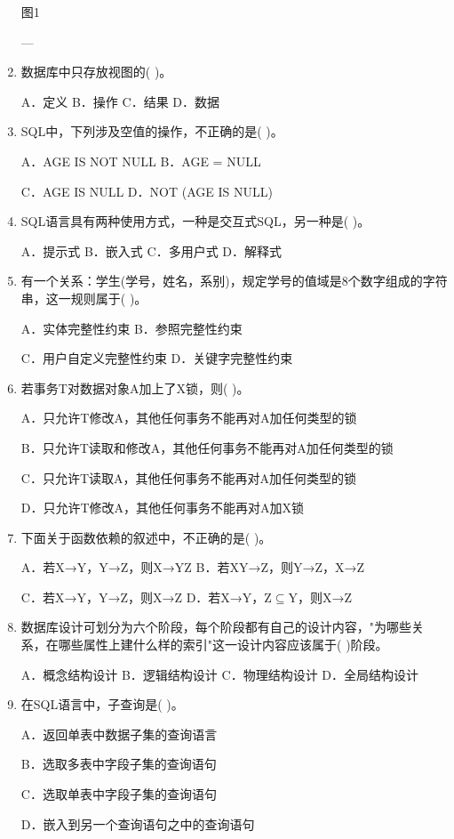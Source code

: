 \documentclass{article}
\begin{document}
\begin{enumerate}
图1

---

\item 数据库中只存放视图的( )。

A．定义 B．操作 C．结果 D．数据

\item SQL中，下列涉及空值的操作，不正确的是( )。

A．AGE IS NOT NULL B．AGE = NULL

C．AGE IS NULL D．NOT (AGE IS NULL)

\item SQL语言具有两种使用方式，一种是交互式SQL，另一种是( )。

A．提示式 B．嵌入式 C．多用户式 D．解释式

\item 有一个关系：学生(学号，姓名，系别)，规定学号的值域是8个数字组成的字符串，这一规则属于( )。

A．实体完整性约束 B．参照完整性约束

C．用户自定义完整性约束 D．关键字完整性约束

\item 若事务T对数据对象A加上了X锁，则( )。

A．只允许T修改A，其他任何事务不能再对A加任何类型的锁

B．只允许T读取和修改A，其他任何事务不能再对A加任何类型的锁

C．只允许T读取A，其他任何事务不能再对A加任何类型的锁

D．只允许T修改A，其他任何事务不能再对A加X锁

\item 下面关于函数依赖的叙述中，不正确的是( )。

A．若X→Y，Y→Z，则X→YZ B．若XY→Z，则Y→Z，X→Z

C．若X→Y，Y→Z，则X→Z D．若X→Y，Z$\subseteq$Y，则X→Z

\item 数据库设计可划分为六个阶段，每个阶段都有自己的设计内容，"为哪些关系，在哪些属性上建什么样的索引"这一设计内容应该属于( )阶段。

A．概念结构设计 B．逻辑结构设计 C．物理结构设计 D．全局结构设计

\item 在SQL语言中，子查询是( )。

A．返回单表中数据子集的查询语言

B．选取多表中字段子集的查询语句

C．选取单表中字段子集的查询语句

D．嵌入到另一个查询语句之中的查询语句


\end{enumerate}
\end{document}
